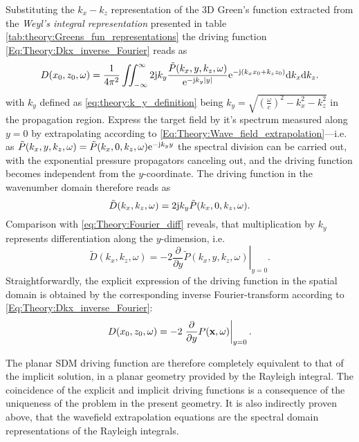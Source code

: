 \vspace{3mm}
Substituting the $k_x-k_z$ representation of the 3D Green's function extracted from the \emph{Weyl's integral representation} \cite{Williams1999, Lalor1969} presented in table \ref{tab:theory:Greens_fun_representations} the driving function \eqref{Eq:Theory:Dkx_inverse_Fourier} reads as
\begin{equation}
D(x_0,z_0,\omega) = \frac{1}{4\pi^2} \iint_{-\infty}^{\infty} 2\mathrm{j} k_y \frac{\tilde{P}(k_x,y,k_z, \omega)}{ \mathrm{e}^{ -\mathrm{j} k_y  | y |  } } \mathrm{e}^{-\mathrm{j} (k_x x_0 + k_z z_0)} \mathrm{d} k_x \mathrm{d} k_z.
\end{equation}
with $k_y$ defined as \eqref{eq:theory:k_y_definition} being $k_y = \sqrt{\left( \frac{\omega}{c}\right)^2 - k_x^2 - k_z^2}$ in the propagation region.	
Express the target field by it's spectrum measured along $y = 0$ by extrapolating according to \eqref{Eq:Theory:Wave_field_extrapolation}---i.e. as 
$
\tilde{P}(k_x,y,k_z, \omega) = \tilde{P}(k_x,0,k_z, \omega)  \mathrm{e}^{ -\mathrm{j} k_y  y }
$
the spectral division can be carried out, with the exponential pressure propagators canceling out, and the driving function becomes independent from the $y$-coordinate. The driving function in the wavenumber domain therefore reads as
\begin{equation}
\tilde{D}(k_x,k_z,\omega) = 2\mathrm{j} k_y \tilde{P}(k_x,0,k_z,\omega).
\label{Eq:Theory:Planar_explicit_driv_fun}
\end{equation}
Comparison with \eqref{eq:Theory:Fourier_diff} reveals, that multiplication by $k_y$ represents differentiation along the $y$-dimension, i.e.
\begin{equation}
\tilde{D}(k_x,k_z,\omega) = -2 \left. \frac{\partial}{\partial y} \tilde{P}(k_x,y,k_z,\omega) \right|_{y = 0}.
\label{Eq:Theory:Planar_explicit_driv_fun_spatial}
\end{equation}
Straightforwardly, the explicit expression of the driving function in the spatial domain is obtained by the corresponding inverse Fourier-transform according to \eqref{Eq:Theory:Dkx_inverse_Fourier}:
\begin{equation}
D(x_0,z_0,\omega) = -2 \left. \frac{\partial}{\partial y} P(\mathbf{x},\omega) \right|_{y = 0}.
\label{Eq:Theory:Planar_explicit_driv_fun_spatial}
\end{equation}

The planar SDM driving function are therefore completely equivalent to that of the implicit solution, in a planar geometry provided by the Rayleigh integral.
The coincidence of the explicit and implicit driving functions is a consequence of the uniqueness of the problem in the present geometry.
It is also indirectly proven above, that the wavefield extrapolation equations are the spectral domain representations of the Rayleigh integrals.
 
